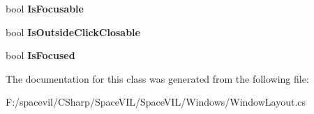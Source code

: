 \begin{DoxyCompactItemize}
\item 
\mbox{\label{class_space_v_i_l_1_1_window_layout_a1cc44d8b7c6128fc32540dc01b5d33c1}} 
bool {\bfseries Is\+Focusable}
\item 
\mbox{\label{class_space_v_i_l_1_1_window_layout_a9b83150f4ba045500b3f92b3ab96645c}} 
bool {\bfseries Is\+Outside\+Click\+Closable}
\item 
\mbox{\label{class_space_v_i_l_1_1_window_layout_a4e6054ac82ea13692ad1c0c9c8c5a12c}} 
bool {\bfseries Is\+Focused}
\end{DoxyCompactItemize}


The documentation for this class was generated from the following file\+:\begin{DoxyCompactItemize}
\item 
F\+:/spacevil/\+C\+Sharp/\+Space\+V\+I\+L/\+Space\+V\+I\+L/\+Windows/Window\+Layout.\+cs\end{DoxyCompactItemize}
